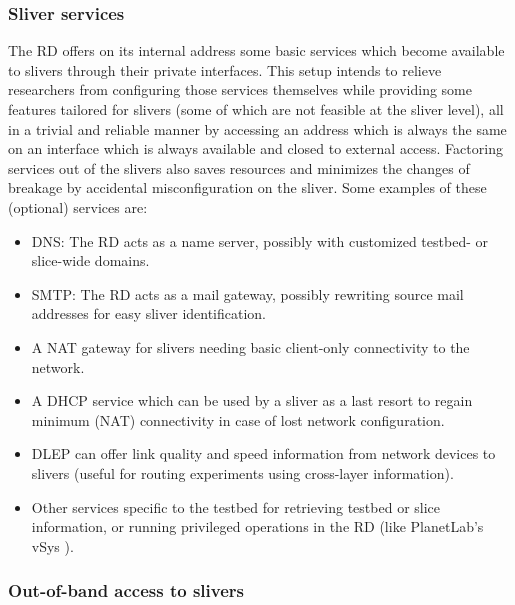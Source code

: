 \documentclass[conference]{IEEEtran}
\begin{document}
\subsubsection{Sliver services}
\label{sec:sliver-services}

The RD offers on its internal address some basic services which become
available to slivers through their private interfaces.  This setup intends to
relieve researchers from configuring those services themselves while providing
some features tailored for slivers (some of which are not feasible at
the sliver level), all in a trivial and reliable manner by accessing an
address which is always the same on an interface which is always available and
closed to external access.  Factoring services out of the slivers also saves
resources and minimizes the changes of breakage by accidental misconfiguration
on the sliver.  Some examples of these (optional) services are:

\begin{itemize}
\item DNS: The RD acts as a name server, possibly with customized testbed- or
  slice-wide domains.
\item SMTP: The RD acts as a mail gateway, possibly rewriting source mail
  addresses for easy sliver identification.
\item A NAT gateway for slivers needing basic client-only connectivity to the
  network.
\item A DHCP service which can be used by a sliver as a last resort to regain
  minimum (NAT) connectivity in case of lost network configuration.
\item DLEP \cite{dlep} can offer link quality and
  speed information from network devices to slivers (useful for routing experiments using
  cross-layer information).
\item Other services specific to the testbed for retrieving testbed or slice
  information, or running privileged operations in the RD (like PlanetLab's
  vSys \cite{vsys}).
\end{itemize}


\subsubsection{Out-of-band access to slivers}
\end{document}
